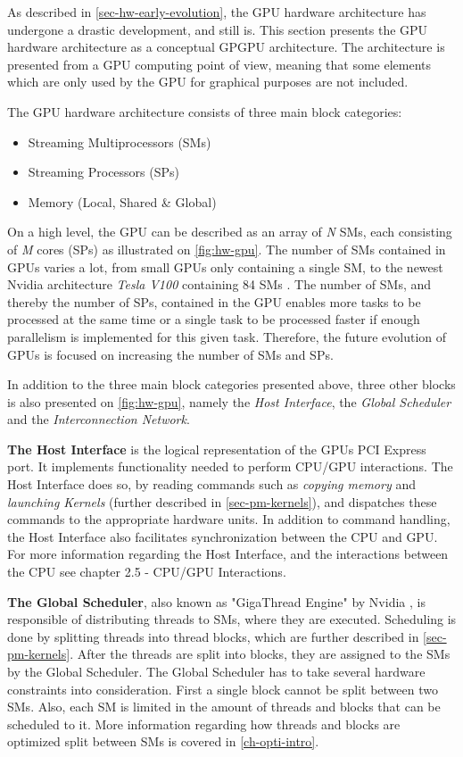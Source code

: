 As described in \cref{sec-hw-early-evolution}, the GPU hardware architecture has undergone a drastic development, and still is.
This section presents the GPU hardware architecture as a conceptual GPGPU architecture.
The architecture is presented from a GPU computing point of view, meaning that some elements which are only used by the GPU for graphical purposes are not included.

The GPU hardware architecture consists of three main block categories:
\begin{itemize}
	\item Streaming Multiprocessors (SMs)
	\item Streaming Processors (SPs) 
	\item Memory (Local, Shared \& Global)
\end{itemize}

On a high level, the GPU can be described as an array of \textit{N} SMs, each consisting of \textit{M} cores (SPs) as illustrated on \cref{fig:hw-gpu}. 
The number of SMs contained in GPUs varies a lot, from small GPUs only containing a single SM, to the newest Nvidia architecture \textit{Tesla V100} containing 84 SMs \cite{Nvidia2017}.
The number of SMs, and thereby the number of SPs, contained in the GPU enables more tasks to be processed at the same time or a single task to be processed faster if enough parallelism is implemented for this given task.
Therefore, the future evolution of GPUs is focused on increasing the number of SMs and SPs.

In addition to the three main block categories presented above, three other blocks is also presented on \cref{fig:hw-gpu}, namely the \textit{Host Interface}, the \textit{Global Scheduler} and the \textit{Interconnection Network}.

\textbf{The Host Interface} is the logical representation of the GPUs PCI Express port.
It implements functionality needed to perform CPU/GPU interactions. 
The Host Interface does so, by reading commands such as \textit{copying memory} and  \textit{launching Kernels} (further described in \cref{sec-pm-kernels}), and dispatches these commands to the appropriate hardware units.
In addition to command handling, the Host Interface also facilitates synchronization between the CPU and GPU. 
For more information regarding the Host Interface, and the interactions between the CPU see \cite{Wilt2013} chapter 2.5 - CPU/GPU Interactions.

\textbf{The Global Scheduler}, also known as "GigaThread Engine" by Nvidia \cite{Nvidia2009}, is responsible of distributing threads to SMs, where they are executed.
Scheduling is done by splitting threads into thread blocks, which are further described in \cref{sec-pm-kernels}.
After the threads are split into blocks, they are assigned to the SMs by the Global Scheduler.
The Global Scheduler has to take several hardware constraints into consideration.
First a single block cannot be split between two SMs.
Also, each SM is limited in the amount of threads and blocks that can be scheduled to it. 
More information regarding how threads and blocks are optimized split between SMs is covered in \cref{ch-opti-intro}.

